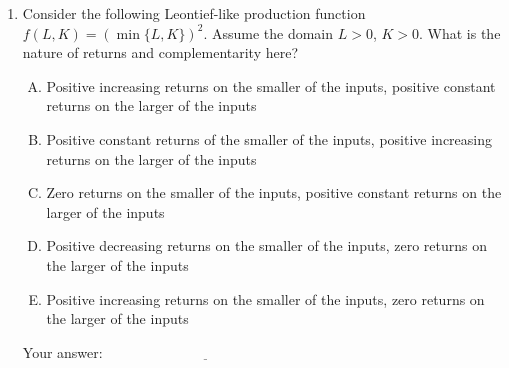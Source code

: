 \documentclass[10pt]{amsart}
\begin{document}
\begin{enumerate}
\item Consider the following Leontief-like production function $f(L,K)
  = (\min \{ L, K \})^2$. Assume the domain $L > 0$, $K > 0$. What is
  the nature of returns and complementarity here?

  \begin{enumerate}[(A)]
  \item Positive increasing returns on the smaller of the inputs,
    positive constant returns on the larger of the inputs
  \item Positive constant returns of the smaller of the inputs,
    positive increasing returns on the larger of the inputs
  \item Zero returns on the smaller of the inputs, positive constant
    returns on the larger of the inputs
  \item Positive decreasing returns on the smaller of the inputs, zero
    returns on the larger of the inputs
  \item Positive increasing returns on the smaller of the inputs, zero
    returns on the larger of the inputs
  \end{enumerate}

  \vspace{0.05in}
  Your answer: $\underline{\qquad\qquad\qquad\qquad\qquad\qquad\qquad}$
  \vspace{0.05in}

\end{enumerate}
\end{document}
